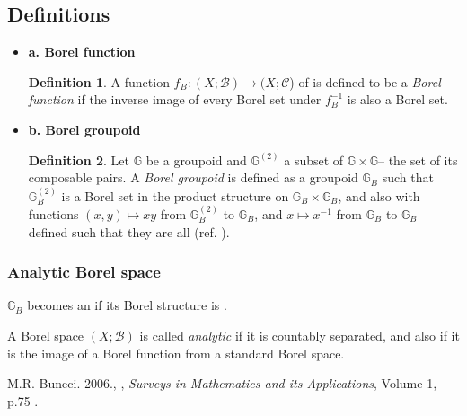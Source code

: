 \documentclass[12pt]{article}
\theoremstyle{plain}
\theoremstyle{definition}
\newtheorem{definition}{Definition}[section]
\numberwithin{equation}{section}
\newcommand{\grp}{{\mathbb G}}
\begin{document}
\subsection{Definitions}
\begin{itemize}
\item {\bf a. Borel function }
\begin{definition}
A function $f_B: (X; \mathcal{B}) \to (X; \mathcal{C}$) of 
 is defined to be a \emph{Borel function} if the inverse image of every Borel set under $f_B ^{-1}$ is also a Borel set. 
\end{definition}

\item {\bf b. Borel groupoid}
\begin{definition}
Let $\grp$ be a groupoid and $\grp^{(2)}$ a subset of $\grp \times \grp$-- the set of its composable pairs.
A {\em Borel groupoid} is defined as a groupoid $\grp_B$ such that  $\grp_B^{(2)}$ is a Borel set in the product structure on $\grp_B \times \grp_B$, and also with functions $ (x,y) \mapsto xy$ from $\grp_B^{(2)}$ to $\grp_B$, and $ x \mapsto x^{-1}$ from $\grp_B$ to $\grp_B$ defined such that they are all 
 (ref. \cite{MRB2k6}). 
\end{definition}
\end{itemize}

\subsubsection{Analytic Borel space}

 $\grp_B$ becomes an  if its Borel structure is 
. 
 
 A Borel space $(X; \mathcal{B})$ is called \emph{analytic} if it is
countably separated, and also if it is the image of a Borel function from a standard
Borel space.


\begin{thebibliography}{9}
M.R. Buneci. 2006.,
,
{\em Surveys in Mathematics and its Applications}, Volume 1, p.75 .

\end{thebibliography}


\end{document}
